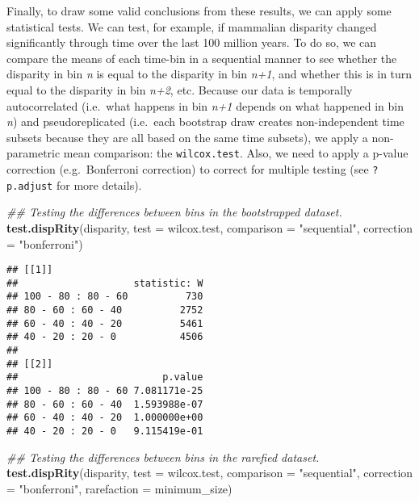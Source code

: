 \documentclass[
]{book}
\newenvironment{Shaded}{\begin{snugshade}}{\end{snugshade}}
\newcommand{\CommentTok}[1]{\textcolor[rgb]{0.56,0.35,0.01}{\textit{#1}}}
\newcommand{\DataTypeTok}[1]{\textcolor[rgb]{0.13,0.29,0.53}{#1}}
\newcommand{\KeywordTok}[1]{\textcolor[rgb]{0.13,0.29,0.53}{\textbf{#1}}}
\newcommand{\NormalTok}[1]{#1}
\newcommand{\StringTok}[1]{\textcolor[rgb]{0.31,0.60,0.02}{#1}}
\begin{document}
Finally, to draw some valid conclusions from these results, we can apply some statistical tests.
We can test, for example, if mammalian disparity changed significantly through time over the last 100 million years.
To do so, we can compare the means of each time-bin in a sequential manner to see whether the disparity in bin \emph{n} is equal to the disparity in bin \emph{n+1}, and whether this is in turn equal to the disparity in bin \emph{n+2}, etc.
Because our data is temporally autocorrelated (i.e.~what happens in bin \emph{n+1} depends on what happened in bin \emph{n}) and pseudoreplicated (i.e.~each bootstrap draw creates non-independent time subsets because they are all based on the same time subsets), we apply a non-parametric mean comparison: the \texttt{wilcox.test}.
Also, we need to apply a p-value correction (e.g.~Bonferroni correction) to correct for multiple testing (see \texttt{?p.adjust} for more details).

\begin{Shaded}
\begin{Highlighting}[]
\CommentTok{\#\# Testing the differences between bins in the bootstrapped dataset.}
\KeywordTok{test.dispRity}\NormalTok{(disparity, }\DataTypeTok{test =}\NormalTok{ wilcox.test, }\DataTypeTok{comparison =} \StringTok{"sequential"}\NormalTok{,}
    \DataTypeTok{correction =} \StringTok{"bonferroni"}\NormalTok{)}
\end{Highlighting}
\end{Shaded}

\begin{verbatim}
## [[1]]
##                    statistic: W
## 100 - 80 : 80 - 60          730
## 80 - 60 : 60 - 40          2752
## 60 - 40 : 40 - 20          5461
## 40 - 20 : 20 - 0           4506
## 
## [[2]]
##                         p.value
## 100 - 80 : 80 - 60 7.081171e-25
## 80 - 60 : 60 - 40  1.593988e-07
## 60 - 40 : 40 - 20  1.000000e+00
## 40 - 20 : 20 - 0   9.115419e-01
\end{verbatim}

\begin{Shaded}
\begin{Highlighting}[]
\CommentTok{\#\# Testing the differences between bins in the rarefied dataset.}
\KeywordTok{test.dispRity}\NormalTok{(disparity, }\DataTypeTok{test =}\NormalTok{ wilcox.test, }\DataTypeTok{comparison =} \StringTok{"sequential"}\NormalTok{,}
    \DataTypeTok{correction =} \StringTok{"bonferroni"}\NormalTok{, }\DataTypeTok{rarefaction  =}\NormalTok{ minimum\_size)}
\end{Highlighting}
\end{Shaded}
\end{document}
